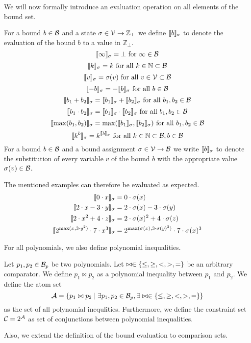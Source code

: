 We will now formally introduce an evaluation operation on all elements of the bound set.

\begin{definition}
  For a bound $b \in \mathcal{B}$ and a state $\sigma \in \mathcal{V} \rightarrow \mathbb{Z}_\bot$ we define $\llbracket b \rrbracket_{\sigma}$ to denote the evaluation of the bound $b$ to a value in $\mathbb{Z}_\bot$.
  \[ \llbracket \infty \rrbracket_{\sigma} = \bot \text{ for } \infty \in \mathcal{B} \] 
  \[ \llbracket k \rrbracket_{\sigma} = k \text{ for all } k \in \mathbb{N} \subset \mathcal{B} \] 
  \[ \llbracket v \rrbracket_{\sigma} = \sigma(v) \text{ for all } v \in \mathcal{V} \subset \mathcal{B} \] 
  \[ \llbracket -b \rrbracket_{\sigma} = -\llbracket b \rrbracket_{\sigma} \text{ for all } b \in \mathcal{B} \] 
  \[ \llbracket b_1 + b_2 \rrbracket_{\sigma} = \llbracket b_1 \rrbracket_{\sigma} + \llbracket b_2 \rrbracket_{\sigma} \text{ for all } b_1, b_2 \in \mathcal{B} \] 
  \[ \llbracket b_1 \cdot b_2 \rrbracket_{\sigma} = \llbracket b_1 \rrbracket_{\sigma} \cdot \llbracket b_2 \rrbracket_{\sigma} \text{ for all } b_1, b_2 \in \mathcal{B} \] 
  \[ \llbracket \max(b_1, b_2) \rrbracket_{\sigma} = \max(\llbracket b_1 \rrbracket_{\sigma}, \llbracket b_2 \rrbracket_{\sigma}) \text{ for all } b_1, b_2 \in \mathcal{B} \]
  \[ \llbracket k^b \rrbracket_{\sigma} = k^{\llbracket b \rrbracket_{\sigma}} \text{ for all } k \in \mathbb{N} \subset \mathcal{B}, b \in \mathcal{B} \]  
  For a bound $b \in \mathcal{B}$ and a bound assignment $\sigma \in \mathcal{V} \rightarrow \mathcal{B}$ we write $\llbracket b \rrbracket_{\sigma}$ to denote the substitution of every variable $v$ of the bound $b$ with the appropriate value $\sigma(v) \in \mathcal{B}$.
\end{definition}

The mentioned examples can therefore be evaluated as expected.
\begin{align*}
  \llbracket 0 \cdot x \rrbracket_{\sigma} &= 0 \cdot \sigma(x) \\
  \llbracket 2 \cdot x - 3 \cdot y \rrbracket_{\sigma} &= 2 \cdot \sigma(x) - 3 \cdot \sigma(y) \\
  \llbracket 2 \cdot x^2 + 4 \cdot z \rrbracket_{\sigma} &= 2 \cdot \sigma(x)^2 + 4 \cdot \sigma(z) \\
  \llbracket 2^{\max(x,3 \cdot y^2)} \cdot 7 \cdot x^3 \rrbracket_{\sigma} &= 2^{\max(\sigma(x),3 \cdot \sigma(y)^2)} \cdot 7 \cdot \sigma(x)^3 \\
\end{align*}

For all polynomials, we also define polynomial inequalities.

\begin{definition}
  Let $p_1, p_2 \in \mathcal{B}_p$ be two polynomials.
  Let $\bowtie \in \lbrace \leq, \geq, <, >, = \rbrace$ be an arbitrary comparator.
  We define $p_1 \bowtie p_2$ as a polynomial inequality between $p_1$ and $p_2$.
  We define the atom set
  \[ \mathcal{A} = \lbrace p_1 \bowtie p_2 \mid \exists p_1, p_2 \in \mathcal{B}_p, \exists \bowtie \in \lbrace \leq, \geq, <, >, = \rbrace \rbrace \]
  as the set of all polynomial inequlities.
  Furthermore, we define the constraint set $\mathcal{C} = 2^{\mathcal{A}}$ as set of conjunctions between polynomial inequalities.
\end{definition}
Also, we extend the definition of the bound evaluation to comparison sets.

